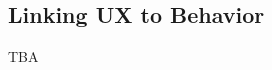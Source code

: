 \documentclass[11pt]{article}
\begin{document}
%
%

\subsection*{Linking UX to Behavior}
TBA
\end{document}
